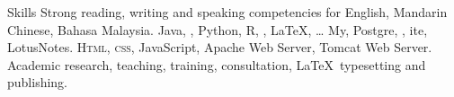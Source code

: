 
\begin{rubric}{Skills}
\entry*[Languages]
	Strong reading, writing and speaking competencies for English, Mandarin Chinese, Bahasa Malaysia.
	Java, , Python, R, , \LaTeX, \ldots
\entry*[Databases]
	My, Postgre, , ite, LotusNotes.
	\textsc{Html, css}, JavaScript, Apache Web Server, Tomcat Web Server.
\entry*[Misc.]
	Academic research, teaching, training, consultation, \LaTeX\ typesetting and publishing.
\end{rubric}

